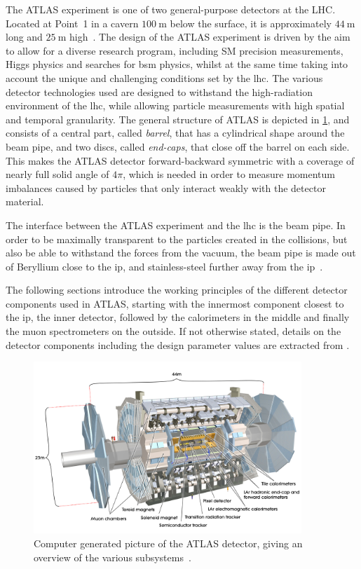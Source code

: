 The ATLAS experiment is one of two general-purpose detectors at the LHC. Located at Point~1 in a cavern $\SI{100}{\meter}$ below the surface, it is approximately $\SI{44}{\meter}$ long and $\SI{25}{\meter}$ high~\cite{Aad:2008zzm}. The design of the ATLAS experiment is driven by the aim to allow for a diverse research program, including SM precision measurements, Higgs physics and searches for \gls{bsm} physics, whilst at the same time taking into account the unique and challenging conditions set by the \gls{lhc}. The various detector technologies used are designed to withstand the high-radiation environment of the \gls{lhc}, while allowing particle measurements with high spatial and temporal granularity. The general structure of ATLAS is depicted in \cref{fig:atlas_detector}, and consists of a central part, called \textit{barrel}, that has a cylindrical shape around the beam pipe, and two discs, called \textit{end-caps}, that close off the barrel on each side. This makes the ATLAS detector forward-backward symmetric with a coverage of nearly full solid angle of $4\pi$, which is needed in order to measure momentum imbalances caused by particles that only interact weakly with the detector material.

The interface between the ATLAS experiment and the \gls{lhc} is the beam pipe. In order to be maximally transparent to the particles created in the collisions, but also be able to withstand the forces from the vacuum, the beam pipe is made out of Beryllium close to the \gls{ip}, and stainless-steel further away from the \gls{ip}~\cite{Brock:1354959}.

The following sections introduce the working principles of the different detector components used in ATLAS, starting with the innermost component closest to the \gls{ip}, the inner detector, followed by the calorimeters in the middle and finally the muon spectrometers on the outside. If not otherwise stated, details on the detector components including the design parameter values are extracted from \cite{Aad:2008zzm}.

\begin{figure}
	\centering    
	\includegraphics[width=0.9\textwidth]{atlas}
	\caption[The ATLAS detector]{Computer generated picture of the ATLAS detector, giving an overview of the various subsystems~\cite{Pequenao:1095924}.}
	\label{fig:atlas_detector}
\end{figure}


